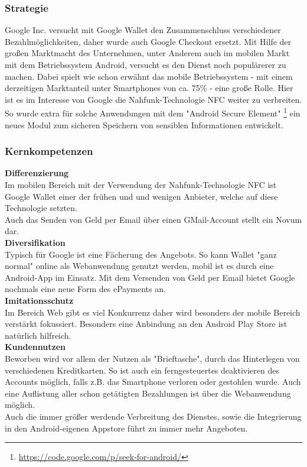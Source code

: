 	
\subsubsection{Strategie}
Google Inc. versucht mit Google Wallet den Zusammenschluss verschiedener Bezahlmöglichkeiten, daher wurde auch Google Checkout ersetzt.
Mit Hilfe der großen Marktmacht des Unternehmen, unter Anderem auch im mobilen Markt mit dem Betriebssystem Android, versucht es den Dienst noch populärerer zu machen. Dabei spielt wie schon erwähnt das mobile Betriebssystem - mit einem derzeitigen Marktanteil unter Smartphones von ca. 75\% - eine große Rolle. Hier ist es im Interesse von Google die Nahfunk-Technologie NFC weiter zu verbreiten. So wurde extra für solche Anwendungen mit dem "Android Secure Element" \footnote{\url{https://code.google.com/p/seek-for-android/}} ein neues Modul zum sicheren Speichern von sensiblen Informationen entwickelt.


\subsubsection{Kernkompetenzen}
\textbf{Differenzierung}\\
Im mobilen Bereich mit der Verwendung der Nahfunk-Technologie NFC ist Google Wallet einer der frühen und und wenigen Anbieter, welche auf diese Technologie setzten.\\
Auch das Senden von Geld per Email über einen GMail-Account stellt ein Novum dar.\\

\textbf{Diversifikation}\\
Typisch für Google ist eine Fächerung des Angebots. So kann Wallet "ganz normal" online als Webanwendung genutzt werden, mobil ist es durch eine Android-App im Einsatz. Mit dem Versenden von Geld per Email bietet Google nochmals eine neue Form des ePayments an.\\

\textbf{Imitationsschutz}\\
Im Bereich Web gibt es viel Konkurrenz daher wird besonders der mobile Bereich verstärkt fokussiert. Besonders eine Anbindung an den Android Play Store ist natürlich hilfreich.\\

\textbf{Kundennutzen}\\
Beworben wird vor allem der Nutzen als "Brieftasche", durch das Hinterlegen von verschiedenen Kreditkarten. So ist auch ein ferngesteuertes deaktivieren des Accounts möglich, falls z.B. das Smartphone verloren oder gestohlen wurde. Auch eine Auflistung aller schon getätigten Bezahlungen ist über die Webanwendung möglich.\\
Auch die immer größer werdende Verbreitung des Dienstes, sowie die Integrierung in den Android-eigenen Appstore führt zu immer mehr Angeboten.\\

